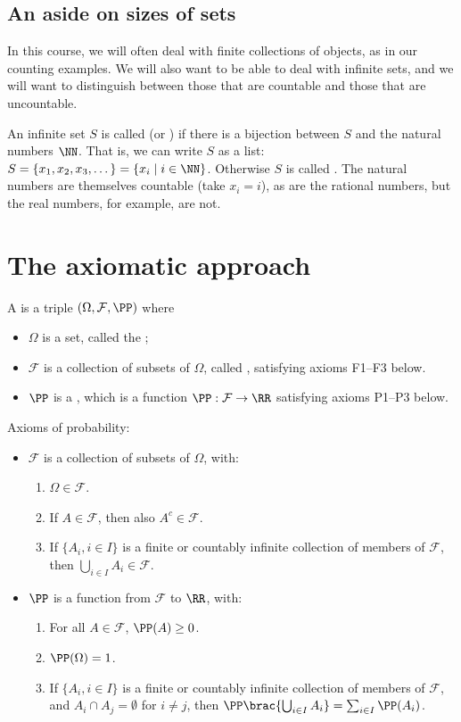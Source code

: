 \subsection{An aside on sizes of sets}
In this course, we will often deal with finite collections of objects, as in our counting examples. We will also want to be able to deal with infinite sets, and we will want to distinguish between those that are countable and those that are uncountable.

An infinite set $S$ is called  (or ) if there is a bijection between $S$ and the natural numbers $\NN$. That is, we can write $S$ as a list: $S=\{x_1,x_2,x_3,\dots\}=\{x_i\mid i\in\NN\}$. Otherwise $S$ is called . The natural numbers are themselves countable (take $x_i=i$), as are the rational numbers, but the real numbers, for example, are not.
\pagebreak

\section{The axiomatic approach}
\begin{definition}
A  is a triple $(\Omega,\mathcal{F},\PP)$ where
\begin{itemize}
\item $\Omega$ is a set, called the ;
\item $\mathcal{F}$ is a collection of subsets of $\Omega$, called , satisfying axioms F1--F3 below.
\item $\PP$ is a , which is a function $\PP:\mathcal{F}\to\RR$ satisfying axioms P1--P3 below.
\end{itemize}
Axioms of probability:
\begin{itemize}
\item $\mathcal{F}$ is a collection of subsets of $\Omega$, with:
\begin{enumerate}[label=F\arabic*:]
    \item $\Omega\in\mathcal{F}$.
    \item If $A\in\mathcal{F}$, then also $A^c\in\mathcal{F}$.
    \item If $\{A_i,i\in I\}$ is a finite or countably infinite collection of members of $\mathcal{F}$, then $\bigcup_{i\in I}A_i\in\mathcal{F}$.
\end{enumerate}
\item $\PP$ is a function from $\mathcal{F}$ to $\RR$, with:
\begin{enumerate}[label=P\arabic*:]
    \item For all $A\in\mathcal{F}$, $\PP(A)\ge0$.
    \item $\PP(\Omega)=1$.
    \item If $\{A_i,i\in I\}$ is a finite or countably infinite collection of members of $\mathcal{F}$, and $A_i\cap A_j=\emptyset$ for $i\neq j$, then $\PP\brac{\bigcup_{i\in I}A_i}=\sum_{i\in I}\PP(A_i)$.
\end{enumerate}
\end{itemize}
\end{definition}

